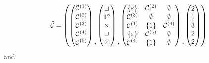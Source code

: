 \[
    \check{\mathcal{C}} = \left(
    \begin{pmatrix}
        \mathcal{C}^{(1)}\\\mathcal{C}^{(2)}\\\mathcal{C}^{(3)}\\\mathcal{C}^{(4)}\\\mathcal{C}^{(5)}    
    \end{pmatrix}
    \begin{matrix}\\ \\ \\ \\,\end{matrix}
    \begin{pmatrix}
        \sqcup\\
        \mathbf{1}^\circ\\
        \times\\
        \sqcup\\
        \times
    \end{pmatrix}
    \begin{matrix}\\ \\ \\ \\,\end{matrix}
    \begin{pmatrix}
        \left\{\varepsilon\right\} & \mathcal{C}^{(2)} & \emptyset\\
        \mathcal{C}^{(3)} & \emptyset & \emptyset\\
        \mathcal{C}^{(1)} & \left\{1\right\} & \mathcal{C}^{(4)}\\
        \left\{\varepsilon\right\} & \mathcal{C}^{(5)}  & \emptyset\\
        \mathcal{C}^{(4)} & \left\{1\right\} & \emptyset
    \end{pmatrix}
    \begin{matrix}\\ \\ \\ \\,\end{matrix}
    \begin{pmatrix}
        2\\1\\3\\2\\2
    \end{pmatrix}
    \right)
\]
and

